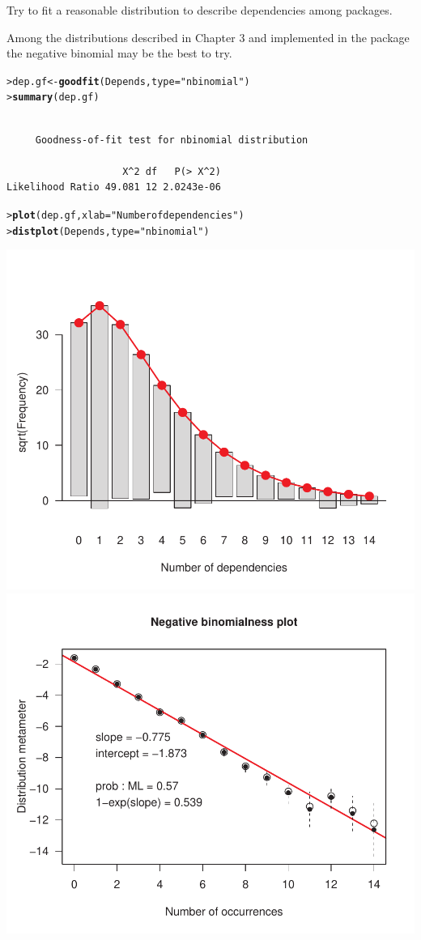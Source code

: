 \documentclass[10pt]{report}\usepackage[]{graphicx}\usepackage[]{color}
\makeatletter
\newcommand{\hlstr}[1]{\textcolor[rgb]{0.192,0.494,0.8}{#1}}%
\newcommand{\hlstd}[1]{\textcolor[rgb]{0.345,0.345,0.345}{#1}}%
\newcommand{\hlkwb}[1]{\textcolor[rgb]{0.69,0.353,0.396}{#1}}%
\newcommand{\hlkwc}[1]{\textcolor[rgb]{0.333,0.667,0.333}{#1}}%
\newcommand{\hlkwd}[1]{\textcolor[rgb]{0.737,0.353,0.396}{\textbf{#1}}}%
\newenvironment{kframe}{%
 \def\at@end@of@kframe{}%
 \ifinner\ifhmode%
  \def\at@end@of@kframe{\end{minipage}}%
  \begin{minipage}{\columnwidth}%
 \fi\fi%
 \def\FrameCommand##1{\hskip\@totalleftmargin \hskip-\fboxsep
 \colorbox{shadecolor}{##1}\hskip-\fboxsep
     \hskip-\linewidth \hskip-\@totalleftmargin \hskip\columnwidth}%
 \MakeFramed {\advance\hsize-\width
   \@totalleftmargin\z@ \linewidth\hsize
   \@setminipage}}%
 {\par\unskip\endMakeFramed%
 \at@end@of@kframe}
\newenvironment{knitrout}{}{} %
\renewenvironment{knitrout}{\small\renewcommand{\baselinestretch}{.85}}{} %
\makeatother
\begin{document}
\begin{Exercises}
\begin{enumerate*}
      \item Try to fit a reasonable distribution to describe dependencies among \R packages.
      \begin{ans}
      Among the distributions described in Chapter 3 and implemented in the  package
      the negative binomial may be the best to try.
\begin{knitrout}\footnotesize
{}\color{fgcolor}\begin{kframe}
\begin{alltt}
\hlstd{> }\hlstd{dep.gf} \hlkwb{<-} \hlkwd{goodfit}\hlstd{(Depends,} \hlkwc{type}\hlstd{=}\hlstr{"nbinomial"}\hlstd{)}
\hlstd{> }\hlkwd{summary}\hlstd{(dep.gf)}
\end{alltt}
\begin{verbatim}

	 Goodness-of-fit test for nbinomial distribution

                    X^2 df   P(> X^2)
Likelihood Ratio 49.081 12 2.0243e-06
\end{verbatim}
\begin{alltt}
\hlstd{> }\hlkwd{plot}\hlstd{(dep.gf,} \hlkwc{xlab}\hlstd{=}\hlstr{"Number of dependencies"}\hlstd{)}
\hlstd{> }\hlkwd{distplot}\hlstd{(Depends,} \hlkwc{type}\hlstd{=}\hlstr{"nbinomial"}\hlstd{)}
\end{alltt}
\end{kframe}

\centerline{\includegraphics[width=.5\textwidth]{soln/fig/ex3_11c-1} 
\includegraphics[width=.5\textwidth]{soln/fig/ex3_11c-2} }




\end{knitrout}
\end{ans}
\end{enumerate*}
\end{Exercises}
\end{document}
